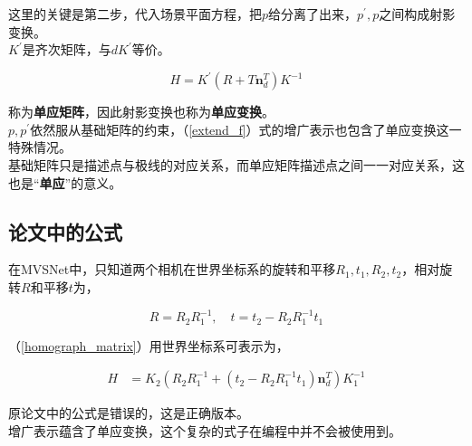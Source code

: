 	这里的关键是第二步，代入场景平面方程，把$p$给分离了出来，$p^\prime,p$之间构成射影变换。\\

	$K^\prime$是齐次矩阵，与$dK^\prime$等价。

	\begin{equation}
		H= K^{\prime}\left(R + T\mathbf{n}_d^T\right)K^{-1} \label{homograph_matrix}
	\end{equation}

	称为\textbf{单应矩阵}，因此射影变换也称为\textbf{单应变换}。\\

	$p,p^{\prime}$依然服从基础矩阵的约束，（\ref{extend_f}）式的增广表示也包含了单应变换这一特殊情况。\\

	基础矩阵只是描述点与极线的对应关系，而单应矩阵描述点之间一一对应关系，这也是“\textbf{单应}”的意义。

	\subsection*{论文中的公式}

	在MVSNet中，只知道两个相机在世界坐标系的旋转和平移$R_1,t_1,R_2, t_2$，相对旋转$R$和平移$t$为，

	$$
		R = R_2R_1^{-1},\quad 
		t = t_2 - R_2R_1^{-1}t_1
	$$

	（\ref{homograph_matrix}）用世界坐标系可表示为，

	\begin{align}
		H &= K_2 \left(R_2R_1^{-1} +\left(t_2 - R_2R_1^{-1}t_1\right) \mathbf{n}_d^T\right) K_1^{-1} \label{new_homograph_matrix}
	\end{align}	

	原论文中的公式是错误的，这是正确版本。\\

	增广表示蕴含了单应变换，这个复杂的式子在编程中并不会被使用到。